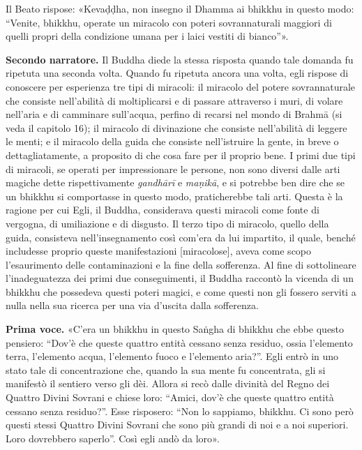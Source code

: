 Il Beato rispose: «Kevaḍḍha, non insegno il Dhamma ai bhikkhu in questo
modo: “Venite, bhikkhu, operate un miracolo con poteri sovrannaturali
maggiori di quelli propri della condizione umana per i laici vestiti di
bianco”».


\textbf{Secondo narratore.} Il Buddha diede la stessa risposta quando tale
domanda fu ripetuta una seconda volta. Quando fu ripetuta ancora una
volta, egli rispose di conoscere per esperienza tre tipi di miracoli: il
miracolo del potere sovrannaturale che consiste nell’abilità di
moltiplicarsi e di passare attraverso i muri, di volare nell’aria e di
camminare sull’acqua, perfino di recarsi nel mondo di Brahmā (si veda il
capitolo 16); il miracolo di divinazione che consiste nell’abilità di
leggere le menti; e il miracolo della guida che consiste nell’istruire
la gente, in breve o dettagliatamente, a proposito di che cosa fare per
il proprio bene. I primi due tipi di miracoli, se operati per
impressionare le persone, non sono diversi dalle arti magiche
dette rispettivamente \emph{gandhārī} e \emph{maṇikā}, e si potrebbe ben dire che
se un bhikkhu si comportasse in questo modo, praticherebbe tali arti.
Questa è la ragione per cui Egli, il Buddha, considerava questi miracoli
come fonte di vergogna, di umiliazione e di disgusto. Il terzo tipo di
miracolo, quello della guida, consisteva nell’insegnamento così com’era
da lui impartito, il quale, benché includesse proprio queste
manifestazioni [miracolose], aveva come scopo l’esaurimento delle
contaminazioni e la fine della sofferenza. Al fine di sottolineare
l’inadeguatezza dei primi due conseguimenti, il Buddha raccontò la
vicenda di un bhikkhu che possedeva questi poteri magici, e come questi
non gli fossero serviti a nulla nella sua ricerca per una via d’uscita
dalla sofferenza.


\textbf{Prima voce.} «C’era un bhikkhu in questo Saṅgha di bhikkhu che ebbe
questo pensiero: “Dov’è che queste quattro entità cessano senza residuo,
ossia l’elemento terra, l’elemento acqua, l’elemento fuoco e l’elemento
aria?”. Egli entrò in uno stato tale di concentrazione che, quando la
sua mente fu concentrata, gli si manifestò il sentiero verso gli dèi.
Allora si recò dalle divinità del Regno dei Quattro Divini Sovrani e
chiese loro: “Amici, dov’è che queste quattro entità cessano senza
residuo?”. Esse risposero: “Non lo sappiamo, bhikkhu. Ci sono però
questi stessi Quattro Divini Sovrani che sono più grandi di noi e a noi
superiori. Loro dovrebbero saperlo”. Così egli andò da loro».


